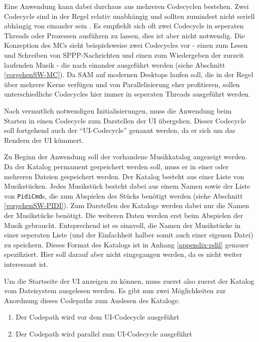Eine Anwendung kann dabei durchaus aus mehreren Codecyclen bestehen.
Zwei Codecycle sind in der Regel relativ unabhängig und sollten zumindest nicht seriell abhängig von einander sein \cite[vgl.][]{fle.TaxonomyComputationShapes.23}.
Es empfiehlt sich oft zwei Codecycle in seperaten Threads oder Prozessen ausführen zu lassen, dies ist aber nicht notwendig.
Die Konzeption des \ac{MC}s sieht beispielsweise zwei Codecycles vor - einen zum Lesen und Schreiben von \ac{SPPP}-Nachrichten und einen zum Wiedergeben der zurzeit laufenden Musik - die nach einander ausgeführt werden (siehe Abschnitt \ref{vorgehenSW-MC}). \newline
Da \ac{SAM} auf modernen Desktops laufen soll, die in der Regel über mehrere Kerne verfügen und von Parallelisierung eher profitieren, sollen unterschiedliche Codecycles hier immer in seperaten Threads ausgeführt werden.

Nach vermutlich notwendigen Initialisierungen, muss die Anwendung beim Starten in einen Codecycle zum Darstellen der \ac{UI} übergehen.
Dieser Codecycle soll fortgehend auch der \enquote{UI-Codecycle} genannt werden, da er sich um das Rendern der \ac{UI} kümmert.

Zu Beginn der Anwendung soll der vorhandene Musikkatalog angezeigt werden.
Da der Katalog permament gespeichert werden soll, muss er in einer oder mehreren Dateien gespeichert werden.
Der Katalog besteht aus einer Liste von Musikstücken.
Jedes Musikstück besteht dabei aus einem Namen sowie der Liste von \lstinline|PidiCmd|s, die zum Abspielen des Stücks benötigt werden (siehe Abschnitt \ref{vorgehenSW-PIDI}). \newline
Zum Darstellen des Katalogs werden dabei nur die Namen der Musikstücke benötigt.
Die weiteren Daten werden erst beim Abspielen der Musik gebraucht.
Entsprechend ist es sinnvoll, die Namen der Musikstücke in einer seperaten Liste (und der Einfachheit halber somit auch einer eigenen Datei) zu speichern. \newline
Dieses Format des Katalogs ist in Anhang \ref{appendix-pdil} genauer spezifiziert.
Hier soll darauf aber nicht eingegangen werden, da es nicht weiter interessant ist.

Um die Startseite der \ac{UI} anzeigen zu können, muss zuerst also zuerst der Katalog vom Dateisystem ausgelesen werden.
Es gibt nun zwei Möglichkeiten zur Anordnung dieses Codepaths zum Auslesen des Katalogs:
\begin{enumerate}
    \item Der Codepath wird vor dem UI-Codecycle ausgeführt
    \item Der Codepath wird parallel zum UI-Codecycle ausgeführt
\end{enumerate}

